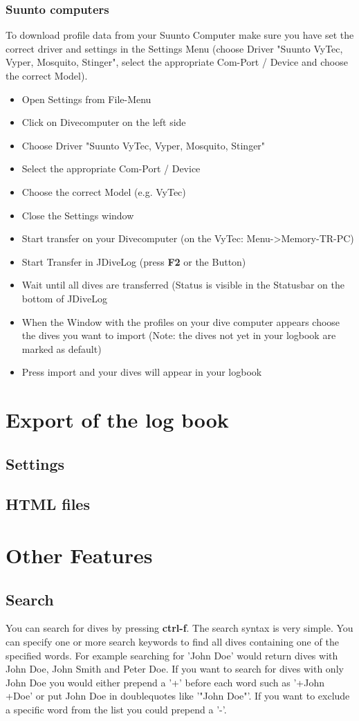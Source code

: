 \documentclass[10pt,a4paper,titlepage]{report}
\begin{document}
\subsection{Suunto computers}
To download profile data from your Suunto Computer make sure you have set the correct driver and settings in the Settings Menu
(choose Driver "Suunto VyTec, Vyper, Mosquito, Stinger", select the appropriate Com-Port / Device and choose the correct Model).
\begin{itemize}
	\item Open Settings from File-Menu
	\item Click on Divecomputer on the left side
	\item Choose Driver "Suunto VyTec, Vyper, Mosquito, Stinger"
	\item Select the appropriate Com-Port / Device
	\item Choose the correct Model (e.g. VyTec)
	\item Close the Settings window
	\item Start transfer on your Divecomputer (on the VyTec: Menu->Memory-TR-PC)
	\item Start Transfer in JDiveLog (press \textbf{F2} or the Button)
	\item Wait until all dives are transferred (Status is visible in the Statusbar on the bottom of JDiveLog
	\item When the Window with the profiles on your dive computer appears choose the dives you want to import (Note: the dives not yet in your logbook are marked as default)
	\item Press import and your dives will appear in your logbook
\end{itemize}
\chapter{Export of the log book}
\section{Settings}
\section{HTML files}

\chapter{Other Features}

\section{Search}
You can search for dives by pressing \textbf{ctrl-f}. The search syntax is very simple. You can specify one
or more search keywords to find all dives containing one of the specified words. For example searching for
'John Doe' would return dives with John Doe, John Smith and Peter Doe. If you want to search for dives with only John Doe
you would either prepend a '+' before each word such as '+John +Doe' or put John Doe in doublequotes like '"John Doe"'.
If you want to exclude a specific word from the list you could prepend a '-'.
\end{document}
